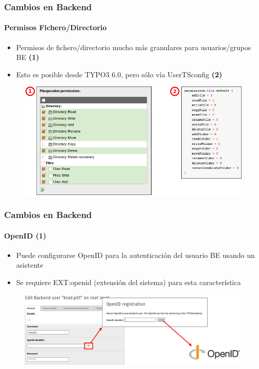 
\begin{frame}[fragile]
	\frametitle{Cambios en Backend}
	\framesubtitle{Permisos Fichero/Directorio}

 	\begin{itemize}
		\item Permisos de fichero/directorio mucho más granulares para usuarios/grupos BE
			\begingroup\color{typo3red}\textbf{(1)}\endgroup
		\item Esto es posible desde TYPO3 6.0, pero sólo vía UserTSconfig
			\begingroup\color{typo3red}\textbf{(2)}\endgroup
	\end{itemize}

	\begin{figure}
		\includegraphics[width=0.75\linewidth]{Images/BackendChanges/FileAndDirectoryPermissions.png}
	\end{figure}

\end{frame}


\begin{frame}[fragile]
	\frametitle{Cambios en Backend}
	\framesubtitle{OpenID (1)}

 	\begin{itemize}
		\item Puede configurarse OpenID para la autenticación del usuario BE usando un asistente
		\item Se requiere EXT:openid (extensión del sistema) para esta característica
	\end{itemize}

	\begin{figure}
		\includegraphics[width=0.95\linewidth]{Images/BackendChanges/OpenIdWizard.png}
	\end{figure}

\end{frame}

